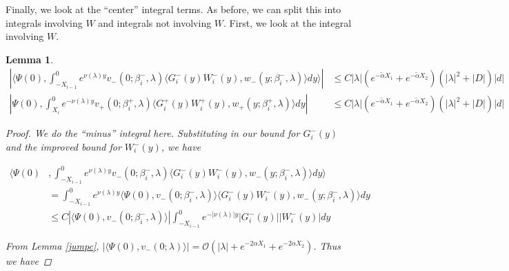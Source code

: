 \documentclass[12pt]{article}
\newtheorem{lemma}{Lemma}
\begin{document}
Finally, we look at the ``center'' integral terms. As before, we can split this into integrals involving $W$ and integrals not involving $W$. First, we look at the integral involving $W$.


\begin{lemma} 

\begin{align*}
\left| \langle \Psi(0), \int_{-X_{i-1}}^0
e^{\nu(\lambda)y} v_-(0; \beta_i^-, \lambda) \langle G_i^-(y)W_i^-(y), w_-(y; \beta_i^-, \lambda) \rangle dy \rangle \right| &\leq C |\lambda| (e^{-\tilde{\alpha} X_1} + e^{-\tilde{\alpha} X_2}) (|\lambda|^2 + |D| ) |d| \\
\left| \Psi(0), \int_{X_i}^0 e^{-\nu(\lambda)y} v_+(0; \beta_i^+, \lambda) \langle G_i^+(y)W_i^+(y), w_+(y; \beta_i^+, \lambda) \rangle dy  \right| &\leq C |\lambda| (e^{-\tilde{\alpha} X_1} + e^{-\tilde{\alpha} X_2}) (|\lambda|^2 + |D| ) |d|
\end{align*}

\begin{proof}

We do the ``minus'' integral here. Substituting in our bound for $G_i^-(y)$ and the improved bound for $W_i^-(y)$, we have

\begin{align*}
\langle \Psi(0) &, \int_{-X_{i-1}}^0
e^{\nu(\lambda)y} v_-(0; \beta_i^-, \lambda) \langle G_i^-(y)W_i^-(y), w_-(y; \beta_i^-, \lambda) \rangle dy \rangle \\
&= \int_{-X_{i-1}}^0
e^{\nu(\lambda)y} \langle \Psi(0), v_-(0; \beta_i^- ,\lambda) \rangle \langle G_i^-(y)W_i^-(y), w_-(y; \beta_i^- , \lambda) \rangle dy \\
&\leq C |\langle \Psi(0), v_-(0; \beta_i^-, \lambda) \rangle| 
\int_{-X_{i-1}}^0 e^{-|\nu(\lambda)|y} |G_i^-(y)||W_i^-(y)| dy 
\end{align*}

From Lemma \ref{jumpc}, $|\langle \Psi(0), v_-(0; \lambda) \rangle| = \mathcal{O}(|\lambda| + e^{-2 \alpha X_1} + e^{-2 \alpha X_2})$. Thus we have


\end{proof}
\end{lemma}
\end{document}
